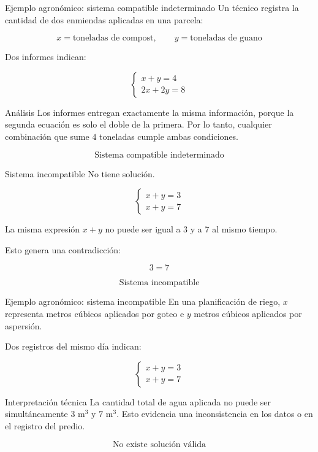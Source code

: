 \documentclass[aspectratio=169]{beamer}
\begin{document}
\begin{frame}{Ejemplo agronómico: sistema compatible indeterminado}
	\small
	Un técnico registra la cantidad de dos enmiendas aplicadas en una parcela:
	
	\[
	x=\text{toneladas de compost}, \qquad y=\text{toneladas de guano}
	\]
	
	Dos informes indican:
	
	\[
	\begin{cases}
		x+y=4\\
		2x+2y=8
	\end{cases}
	\]
	
	\begin{block}{Análisis}
		Los informes entregan exactamente la misma información, porque la segunda ecuación es solo el doble de la primera. Por lo tanto, cualquier combinación que sume \(4\) toneladas cumple ambas condiciones.
	\end{block}
	
	\[
	\boxed{\text{Sistema compatible indeterminado}}
	\]
\end{frame}
	
\begin{frame}{Sistema incompatible}
	No tiene solución.
	
	\[
	\begin{cases}
		x+y=3\\
		x+y=7
	\end{cases}
	\]
	
	\bigskip
	
	La misma expresión \(x+y\) no puede ser igual a 3 y a 7 al mismo tiempo.
	
	\bigskip
	
	Esto genera una contradicción:
	
	\[
	3=7
	\]
	
	\[
	\boxed{\text{Sistema incompatible}}
	\]
\end{frame}

\begin{frame}{Ejemplo agronómico: sistema incompatible}
	\small
	En una planificación de riego, \(x\) representa metros cúbicos aplicados por goteo e \(y\) metros cúbicos aplicados por aspersión.
	
	\bigskip
	
	Dos registros del mismo día indican:
	
	\[
	\begin{cases}
		x+y=3\\
		x+y=7
	\end{cases}
	\]
	
	\begin{block}{Interpretación técnica}
		La cantidad total de agua aplicada no puede ser simultáneamente \(3\) m\(^3\) y \(7\) m\(^3\). Esto evidencia una inconsistencia en los datos o en el registro del predio.
	\end{block}
	
	\[
	\boxed{\text{No existe solución válida}}
	\]
\end{frame}
	
\end{document}
